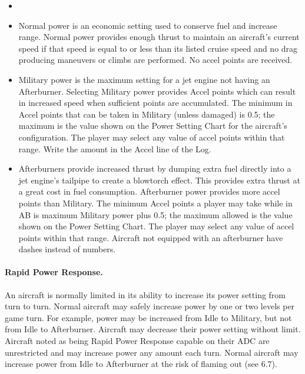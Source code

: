 \begin{itemize}
    \item{} 

    \item{} Normal power is an economic setting used to conserve fuel and increase range. Normal power provides enough thrust to maintain an aircraft's current speed if that speed is equal to or less than its listed cruise speed and no drag producing maneuvers or climbs are performed. No accel points are received.

    \item{} Military power is the maximum setting for a jet engine not having an Afterburner. Selecting Military power provides Accel points which can result in increased speed when sufficient points are accumulated. The minimum in Accel points that can be taken in Military (unless damaged) is 0.5; the maximum is the value shown on the Power Setting Chart for the aircraft's configuration.  The player may select any value of accel points within that range. Write the amount in the Accel line of the Log.

    \item{} Afterburners provide increased thrust by dumping extra fuel directly into a jet engine's tailpipe to create a blowtorch effect. This provides extra thrust at a great cost in fuel consumption. Afterburner power provides more accel points than Military. The minimum Accel points a player may take while in AB is maximum Military power plus 0.5; the maximum allowed is the value shown on the Power Setting Chart. The player may select any value of accel points within that range. Aircraft not equipped with an afterburner have dashes instead of numbers.

\end{itemize}

\paragraph{Rapid Power Response.} An aircraft is normally limited in its ability to increase its power setting from turn to turn. Normal aircraft may safely increase power by one or two levels per game turn. For example, power may be increased from Idle to Military, but not from Idle to Afterburner. Aircraft may decrease their power setting without limit. Aircraft noted as being Rapid Power Response capable on their ADC are unrestricted and may increase power any amount each turn. Normal aircraft may increase power from Idle to Afterburner at the risk of flaming out (see 6.7).

